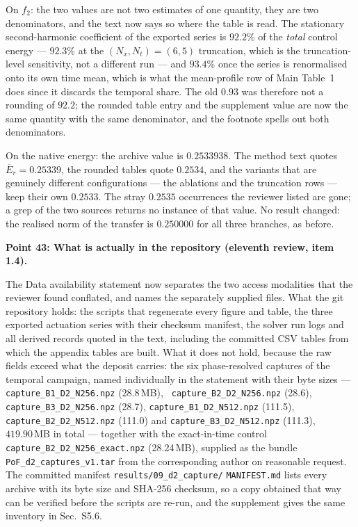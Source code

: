 \documentclass[11pt,a4paper]{article}
\begin{document}
On \(f_2\): the two values are not two estimates of one quantity, they are two
denominators, and the text now says so where the table is read. The stationary
second-harmonic coefficient of the exported series is \(92.2\%\) of the \emph{total}
control energy --- \(92.3\%\) at the \((N_x,N_t)=(6,5)\) truncation, which is the
truncation-level sensitivity, not a different run --- and \(93.4\%\) once the series is
renormalised onto its own time mean, which is what the mean-profile row of Main Table~1
does since it discards the temporal share. The old \(0.93\) was therefore not a rounding
of \(92.2\); the rounded table entry and the supplement value are now the same quantity
with the same denominator, and the footnote spells out both denominators.

On the native energy: the archive value is \(0.2533938\). The method text quotes
\(\overline{E}_r=0.25339\), the rounded tables quote \(0.2534\), and the variants that
are genuinely different configurations --- the ablations and the truncation rows --- keep
their own \(0.2533\). The stray \(0.2535\) occurrences the reviewer listed are gone; a
grep of the two sources returns no instance of that value. No result changed: the realised
norm of the transfer is \(0.250000\) for all three branches, as before.

\vspace{1em}

\noindent\textbf{Point 43: What is actually in the repository (eleventh review, item 1.4).}

The Data availability statement now separates the two access modalities that the reviewer
found conflated, and names the separately supplied files. What the git repository holds:
the scripts that regenerate every figure and table, the three exported actuation series
with their checksum manifest, the solver run logs and all derived records quoted in the
text, including the committed CSV tables from which the appendix tables are built. What
it does not hold, because the raw fields exceed what the deposit carries: the six
phase-resolved captures of the temporal campaign, named individually in the statement
with their byte sizes --- \texttt{capture\_B1\_D2\_N256.npz} (28.8\,MB), \texttt{%
capture\_B2\_D2\_N256.npz} (28.6), \texttt{capture\_B3\_D2\_N256.npz} (28.7),
\texttt{capture\_B1\_D2\_N512.npz} (111.5), \texttt{capture\_B2\_D2\_N512.npz} (111.0) and
\texttt{capture\_B3\_D2\_N512.npz} (111.3), \(419.90\,\mathrm{MB}\) in total --- together
with the exact-in-time control \texttt{capture\_B2\_D2\_N256\_exact.npz} (28.24\,MB),
supplied as the bundle \texttt{PoF\_d2\_captures\_v1.tar} from the corresponding author on
reasonable request. The committed manifest \texttt{results/09\_d2\_capture/}\hspace{0pt}%
\texttt{MANIFEST.md} lists every archive with its byte size and SHA-256 checksum, so a
copy obtained that way can be verified before the scripts are re-run, and the supplement
gives the same inventory in Sec.~S5.6.
\end{document}
